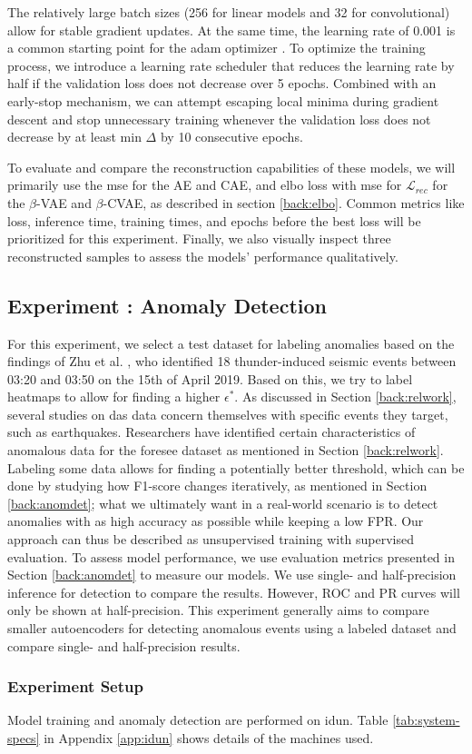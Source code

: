  The relatively large batch sizes (256 for linear models and 32 for convolutional) allow for stable gradient updates. At the same time, the learning rate of 0.001 is a common starting point for the \acrshort{adam} optimizer \cite{kingma2017adam}. To optimize the training process, we introduce a learning rate scheduler that reduces the learning rate by half if the validation loss does not decrease over 5 epochs. Combined with an early-stop mechanism, we can attempt escaping local minima during gradient descent and stop unnecessary training whenever the validation loss does not decrease by at least min $\Delta$ by 10 consecutive epochs.  

To evaluate and compare the reconstruction capabilities of these models, we will primarily use the \acrshort{mse} for the AE and CAE, and  \acrshort{elbo} loss with \acrshort{mse} for $\mathcal{L}_{rec}$ for the $\beta$-VAE and $\beta$-CVAE, as described in section \ref{back:elbo}. Common metrics like loss, inference time, training times, and epochs before the best loss will be prioritized for this experiment. Finally, we also visually inspect three reconstructed samples to assess the models' performance qualitatively.

\subsection{Experiment : Anomaly Detection}

For this experiment, we select a test dataset for labeling anomalies based on the findings of Zhu et al. \cite{zhu2023seismic}, who identified 18 thunder-induced seismic events between 03:20 and 03:50 on the 15th of April 2019. Based on this, we try to label heatmaps to allow for finding a higher $\epsilon^*$. As discussed in Section \ref{back:relwork}, several studies on \acrshort{das} data concern themselves with specific events they target, such as earthquakes. Researchers have identified certain characteristics of anomalous data for the \acrshort{foresee} dataset as mentioned in Section \ref{back:relwork}. Labeling some data allows for finding a potentially better threshold, which can be done by studying how F1-score changes iteratively, as mentioned in Section \ref{back:anomdet}; what we ultimately want in a real-world scenario is to detect anomalies with as high accuracy as possible while keeping a low FPR. Our approach can thus be described as unsupervised training with supervised evaluation. To assess model performance, we use evaluation metrics presented in Section \ref{back:anomdet} to measure our models. We use single- and half-precision inference for detection to compare the results. However, ROC and PR curves will only be shown at half-precision. This experiment generally aims to compare smaller autoencoders for detecting anomalous events using a labeled dataset and compare single- and half-precision results.

\subsubsection{Experiment Setup}
Model training and anomaly detection are performed on \gls{idun}. Table \ref{tab:system-specs} in Appendix \ref{app:idun} shows details of the machines used. \\

